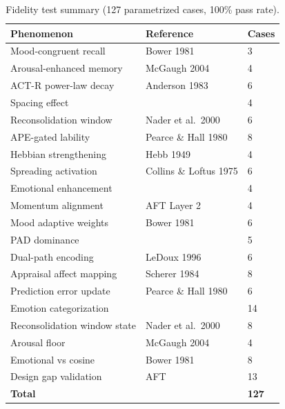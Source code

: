 \documentclass[11pt]{article}
\begin{document}
\begin{table}[ht]
\centering
\caption{Fidelity test summary (127 parametrized cases, 100\% pass rate).}
\label{tab:fidelity}
\begin{tabular}{lll}
\toprule
\textbf{Phenomenon} & \textbf{Reference} & \textbf{Cases} \\
\midrule
Mood-congruent recall        & Bower 1981              & 3  \\
Arousal-enhanced memory      & McGaugh 2004            & 4  \\
ACT-R power-law decay        & Anderson 1983           & 6  \\
Spacing effect               & \citet{ebbinghaus1885memory} & 4  \\
Reconsolidation window       & Nader et al.\ 2000      & 6  \\
APE-gated lability           & Pearce \& Hall 1980     & 8  \\
Hebbian strengthening        & Hebb 1949               & 4  \\
Spreading activation         & Collins \& Loftus 1975  & 6  \\
Emotional enhancement        & \citet{kensinger2004emotional}& 4  \\
Momentum alignment           & AFT Layer 2             & 4  \\
Mood adaptive weights        & Bower 1981              & 6  \\
PAD dominance                & \citet{mehrabian1974approach} & 5  \\
Dual-path encoding           & LeDoux 1996             & 6  \\
Appraisal affect mapping     & Scherer 1984            & 8  \\
Prediction error update      & Pearce \& Hall 1980     & 6  \\
Emotion categorization       & \citet{plutchik1980general} & 14 \\
Reconsolidation window state & Nader et al.\ 2000      & 8  \\
Arousal floor                & McGaugh 2004            & 4  \\
Emotional vs cosine          & Bower 1981              & 8  \\
Design gap validation        & AFT                     & 13 \\
\bottomrule
\multicolumn{2}{l}{\textbf{Total}} & \textbf{127} \\
\end{tabular}
\end{table}
\end{document}
